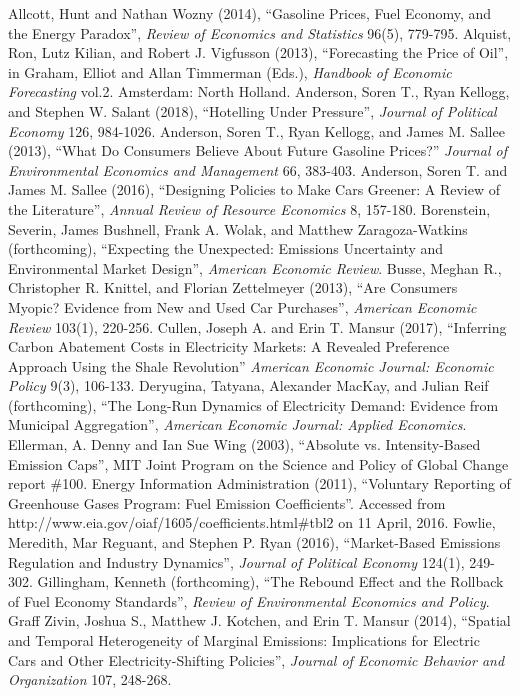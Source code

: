 \documentclass[12pt]{article}
\begin{document}
\begin{thebibliography}{99}
\bibitem{} Allcott, Hunt and Nathan Wozny (2014), ``Gasoline Prices, Fuel Economy, and the Energy Paradox'', {\it Review of Economics and Statistics} 96(5), 779-795.
\bibitem{} Alquist, Ron, Lutz Kilian, and Robert J. Vigfusson (2013), ``Forecasting the Price of Oil'', in Graham, Elliot and Allan Timmerman (Eds.), {\it Handbook of Economic Forecasting} vol.2. Amsterdam: North Holland.
\bibitem{} Anderson, Soren T., Ryan Kellogg, and Stephen W. Salant (2018), ``Hotelling Under Pressure'', {\it Journal of Political Economy} 126, 984-1026.
\bibitem{} Anderson, Soren T., Ryan Kellogg, and James M. Sallee (2013), ``What Do Consumers Believe About Future Gasoline Prices?'' {\it Journal of Environmental Economics and Management} 66, 383-403.
\bibitem{} Anderson, Soren T. and James M. Sallee (2016), ``Designing Policies to Make Cars Greener: A Review of the Literature'', {\it Annual Review of Resource Economics} 8, 157-180.
\bibitem{} Borenstein, Severin, James Bushnell, Frank A. Wolak, and Matthew Zaragoza-Watkins (forthcoming), ``Expecting the Unexpected: Emissions Uncertainty and Environmental Market Design'', {\it American Economic Review}.
\bibitem{} Busse, Meghan R., Christopher R. Knittel, and Florian Zettelmeyer (2013), ``Are Consumers Myopic? Evidence from New and Used Car Purchases'', {\it American Economic Review} 103(1), 220-256.
\bibitem{} Cullen, Joseph A. and Erin T. Mansur (2017), ``Inferring Carbon Abatement Costs in Electricity Markets: A Revealed Preference Approach Using the Shale Revolution'' {\it American Economic Journal: Economic Policy} 9(3), 106-133.
\bibitem{} Deryugina, Tatyana, Alexander MacKay, and Julian Reif (forthcoming), ``The Long-Run Dynamics of Electricity Demand: Evidence from Municipal Aggregation'', {\it American Economic Journal: Applied Economics}.
\bibitem{} Ellerman, A. Denny and Ian Sue Wing (2003), ``Absolute vs. Intensity-Based Emission Caps'', MIT Joint Program on the Science and Policy of Global Change report \#100.
\bibitem{} Energy Information Administration (2011), ``Voluntary Reporting of Greenhouse Gases Program: Fuel Emission Coefficients''. Accessed from http://www.eia.gov/oiaf/1605/coefficients.html\#tbl2 on 11 April, 2016.
\bibitem{} Fowlie, Meredith, Mar Reguant, and Stephen P. Ryan (2016), ``Market-Based Emissions Regulation and Industry Dynamics'', {\it Journal of Political Economy} 124(1), 249-302.
\bibitem{} Gillingham, Kenneth (forthcoming), ``The Rebound Effect and the Rollback of Fuel Economy Standards'',  {\it Review of Environmental Economics and Policy}.
\bibitem{} Graff Zivin, Joshua S., Matthew J. Kotchen, and Erin T. Mansur (2014), ``Spatial and Temporal Heterogeneity of Marginal Emissions: Implications for Electric Cars and Other Electricity-Shifting Policies'', {\it Journal of Economic Behavior and Organization} 107, 248-268.

\end{thebibliography}
\end{document}
